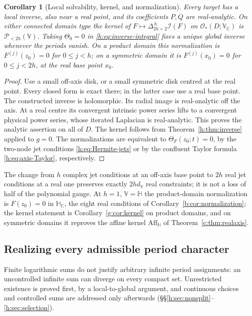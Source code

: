 \documentclass[11pt,a4paper]{article}
\numberwithin{equation}{section}
\newtheorem{corollary}[theorem]{Corollary}
\theoremstyle{definition}
\theoremstyle{remark}
\theoremstyle{plain}
\newcommand{\HH}{\mathbb H}
\newcommand{\HC}{\mathbb H_{\mathbb C}}
\newcommand{\CC}{\mathbb C}
\newcommand{\I}{\mathcal I}
\newcommand{\Aff}{\mathrm{Aff}_{\HH}}
\newcommand{\lapH}{\Delta_{2h+2}^{\,h}}
\newcommand{\VV}{\mathbb V}                       %
\newcommand{\VC}{\mathbb V_{\CC}}                 %
\newcommand{\dV}{d_{\VV}}                         %
\newcommand{\PolH}{\mathscr P_{<2h}(\VV)}
\newcommand{\Herm}{\Theta}                        %
\begin{document}
\begin{corollary}[Local solvability, kernel, and normalization]
\label{h:cor:local}
Every target has a local inverse, also near a real point, and its coefficients
$P,Q$ are real-analytic. On either connected domain type the kernel of
$F\mapsto\lapH\I(F)$ on $\mathcal O_*(D;\VC)$ is $\PolH$. Taking $\Herm_0=0$
in \eqref{h:eq:inverse-integral} fixes a unique global inverse whenever the
periods vanish. On a product domain this normalization is $F^{(j)}(z_0)=0$ for
$0\le j<h$; on a symmetric domain it is $F^{(j)}(x_0)=0$ for $0\le j<2h$, at the
real base point $x_0$.
\end{corollary}

\begin{proof}
Use a small off-axis disk, or a small symmetric disk centred at the real point.
Every closed form is exact there; in the latter case use a real base point.
The constructed inverse is holomorphic. Its radial image is real-analytic off
the axis. At a real centre its convergent intrinsic power series lifts to a
convergent physical power series, whose iterated Laplacian is real-analytic.
This proves the analytic assertion on all of $D$. The kernel follows from
Theorem~\ref{h:thm:inverse} applied to $g=0$. The normalizations are equivalent
to $\Herm_F(z_0;t)=0$, by the two-node jet conditions \eqref{h:eq:Hermite-jets}
or by the confluent Taylor formula \eqref{h:eq:axis-Taylor}, respectively.
\end{proof}

The change from $h$ complex jet conditions at an off-axis base point to $2h$
real jet conditions at a real one preserves exactly $2h\dV$ real constraints;
it is not a loss of half of the polynomial gauge. At $h=1$, $\VV=\HH$ the
product-domain normalization is $F(z_0)=0$ in $\HC$, the eight real conditions
of Corollary~\ref{b:cor:normalization}; the kernel statement is
Corollary~\ref{g:cor:kernel} on product domains, and on symmetric domains it
reproves the affine kernel $\Aff$ of Theorem~\ref{c:thm:realaxis}.

\subsection{Realizing every admissible period character}
\label{h:sec:realization}

Finite logarithmic sums do not justify arbitrary infinite period assignments:
an uncontrolled infinite sum can diverge on every compact set. Unrestricted
existence is proved first, by a local-to-global argument, and continuous
choices and controlled sums are addressed only afterwards
(\S\S\ref{h:sec:nonsplit}--\ref{h:sec:selection}).
\end{document}

